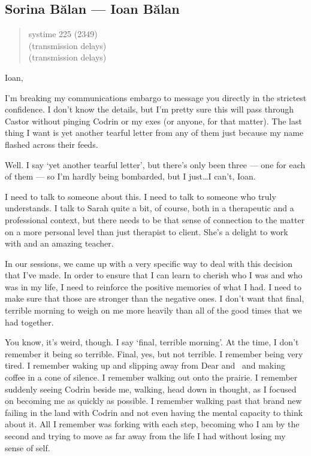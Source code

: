 \hypertarget{sorina-bux103lan-ioan-bux103lan}{%
\subsection{Sorina Bălan — Ioan Bălan}\label{sorina-bux103lan-ioan-bux103lan}}

\begin{quote}
systime 225 (2349)\\
(transmission delays)\\
(transmission delays)
\end{quote}

Ioan,

I'm breaking my communications embargo to message you directly in the strictest confidence. I don't know the details, but I'm pretty sure this will pass through Castor without pinging Codrin or my exes (or anyone, for that matter). The last thing I want is yet another tearful letter from any of them just because my name flashed across their feeds.

Well. I say `yet another tearful letter', but there's only been three — one for each of them — so I'm hardly being bombarded, but I just\ldots{}I can't, Ioan.

I need to talk to someone about this. I need to talk to someone who truly understands. I talk to Sarah quite a bit, of course, both in a therapeutic and a professional context, but there needs to be that sense of connection to the matter on a more personal level than just therapist to client. She's a delight to work with and an amazing teacher.

In our sessions, we came up with a very specific way to deal with this decision that I've made. In order to ensure that I can learn to cherish who I was and who was in my life, I need to reinforce the positive memories of what I had. I need to make sure that those are stronger than the negative ones. I don't want that final, terrible morning to weigh on me more heavily than all of the good times that we had together.

You know, it's weird, though. I say `final, terrible morning'. At the time, I don't remember it being so terrible. Final, yes, but not terrible. I remember being very tired. I remember waking up and slipping away from Dear and \Partner\ and making coffee in a cone of silence. I remember walking out onto the prairie. I remember suddenly seeing Codrin beside me, walking, head down in thought, as I focused on becoming me as quickly as possible. I remember walking past that brand new failing in the land with Codrin and not even having the mental capacity to think about it. All I remember was forking with each step, becoming who I am by the second and trying to move as far away from the life I had without losing my sense of self.

